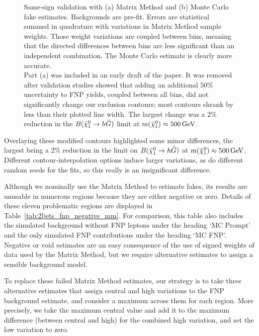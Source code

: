 \begin{figure}[tp]
\begin{subfigure}{0.495\textwidth}
\caption{}
\label{fig:2ljets_vrss_mc}
\end{subfigure}
\caption[
Same-sign validation with Matrix Method and Monte Carlo fake estimates
]{%
Same-sign validation with (a) Matrix Method and (b) Monte Carlo fake estimates.
Backgrounds are pre-fit.
Errors are statistical summed in quadrature with variations in Matrix Method
sample weights.
Those weight variations are coupled between bins, meaning that the
directed differences between bins are less significant than an independent
combination.
The Monte Carlo estimate is clearly more accurate.
\\[0.5em]
Part (a) was included in an early draft of the paper.
It was removed after validation studies showed that adding an additional
$50\%$ uncertainty to FNP yields, coupled between all bins, did not
significantly change our exclusion contours;
most contours shrank by less than their plotted line width.
The largest change was a $2\%$ reduction in the
$B(\neutralino_1 \to h \gravitino)$
limit at $m(\neutralino_1) \approx 500\,\eV[G]$.
}
\label{fig:2ljets_vrss}
\end{figure}

Overlaying these modified contours highlighted some minor differences, the
largest being a $2\%$ reduction in the limit on
$B(\neutralino_1 \to h \gravitino)$ at
$m(\neutralino_1) \approx 500\,\eV[G]$.
Different contour-interpolation options induce larger variations, as do
different random seeds for the fits, so this really is an insignificant
difference.

Although we nominally use the Matrix Method to estimate fakes, its results
are unusable in numerous regions because they are either negative or zero.
Details of these eleven problematic regions are displayed in
Table~\ref{tab:2ljets_fnp_negative_mm}.
For comparison, this table also includes the simulated background without
FNP leptons under the heading `MC Prompt' and the only
simulated FNP contributions under the heading `MC FNP'.
Negative or void estimates are an easy consequence of the use of signed
weights of data used by the Matrix Method, but we require alternative
estimates to assign a sensible background model.

To replace these failed Matrix Method estimates, our strategy is to take three
alternative estimates that assign central and high variations to the
FNP background estimate, and consider a maximum across them for
each region.
More precisely, we take the maximum central value and add it to the maximum
difference (between central and high) for the combined high variation, and
set the low variation to zero.

